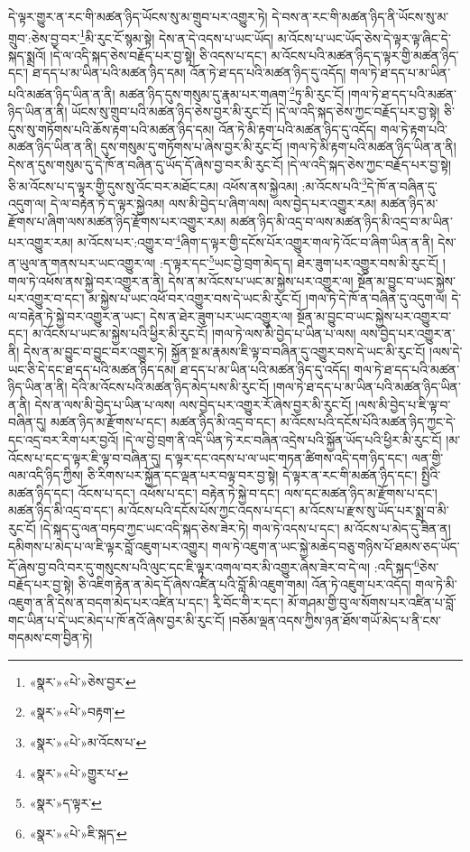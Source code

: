 དེ་ལྟར་གྱུར་ན་རང་གི་མཚན་ཉིད་ཡོངས་སུ་མ་གྲུབ་པར་འགྱུར་ཏེ། དེ་བས་ན་རང་གི་མཚན་ཉིད་ནི་ཡོངས་སུ་མ་གྲུབ་:ཅེས་བྱ་བར་\footnote{«སྣར་»«པེ་»ཅེས་བྱར་}མི་རུང་ངོ་སྙམ་སྟེ། དེས་ན་དེ་འདས་པ་ཡང་ཡོད། མ་འོངས་པ་ཡང་ཡོད་ཅེས་དེ་ལྟར་ལྟ་ཞིང་དེ་སྐད་སྨྲའོ། །དེ་ལ་འདི་སྐད་ཅེས་བརྗོད་པར་བྱ་སྟེ། ཅི་འདས་པ་དང་། མ་འོངས་པའི་མཚན་ཉིད་ད་ལྟར་གྱི་མཚན་ཉིད་དང་། ཐ་དད་པ་མ་ཡིན་པའི་མཚན་ཉིད་དམ། འོན་ཏེ་ཐ་དད་པའི་མཚན་ཉིད་དུ་འདོད། གལ་ཏེ་ཐ་དད་པ་མ་ཡིན་པའི་མཚན་ཉིད་ཡིན་ན་ནི། མཚན་ཉིད་དུས་གསུམ་དུ་རྣམ་པར་གཞག་\footnote{«སྣར་»«པེ་»བརྟག་}ཏུ་མི་རུང་ངོ། །གལ་ཏེ་ཐ་དད་པའི་མཚན་ཉིད་ཡིན་ན་ནི། ཡོངས་སུ་གྲུབ་པའི་མཚན་ཉིད་ཅེས་བྱར་མི་རུང་ངོ། །དེ་ལ་འདི་སྐད་ཅེས་ཀྱང་བརྗོད་པར་བྱ་སྟེ། ཅི་དུས་སུ་གཏོགས་པའི་ཆོས་རྟག་པའི་མཚན་ཉིད་དམ། འོན་ཏེ་མི་རྟག་པའི་མཚན་ཉིད་དུ་འདོད། གལ་ཏེ་རྟག་པའི་མཚན་ཉིད་ཡིན་ན་ནི། དུས་གསུམ་དུ་གཏོགས་པ་ཞེས་བྱར་མི་རུང་ངོ། །གལ་ཏེ་མི་རྟག་པའི་མཚན་ཉིད་ཡིན་ན་ནི། དེས་ན་དུས་གསུམ་དུ་དེ་ཁོ་ན་བཞིན་དུ་ཡོད་དོ་ཞེས་བྱ་བར་མི་རུང་ངོ། །དེ་ལ་འདི་སྐད་ཅེས་ཀྱང་བརྗོད་པར་བྱ་སྟེ། ཅི་མ་འོངས་པ་ད་ལྟར་གྱི་དུས་སུ་འོང་བར་མཐོང་ངམ། འཕོས་ནས་སྐྱེའམ། :མ་འོངས་པའི་\footnote{«སྣར་»«པེ་»མ་འོངས་པ་}དེ་ཁོ་ན་བཞིན་དུ་འདུག་ལ། དེ་ལ་བརྟེན་ཏེ་ད་ལྟར་སྐྱེའམ། ལས་མི་བྱེད་པ་ཞིག་ལས། ལས་བྱེད་པར་འགྱུར་རམ། མཚན་ཉིད་མ་རྫོགས་པ་ཞིག་ལས་མཚན་ཉིད་རྫོགས་པར་འགྱུར་རམ། མཚན་ཉིད་མི་འདྲ་བ་ལས་མཚན་ཉིད་མི་འདྲ་བ་མ་ཡིན་པར་འགྱུར་རམ། མ་འོངས་པར་:འགྱུར་བ་\footnote{«སྣར་»«པེ་»གྱུར་པ་}ཞིག་ད་ལྟར་གྱི་དངོས་པོར་འགྱུར་གལ་ཏེ་འོང་བ་ཞིག་ཡིན་ན་ནི། དེས་ན་ཡུལ་ན་གནས་པར་ཡང་འགྱུར་ལ། :ད་ལྟར་དང་\footnote{«སྣར་»ད་ལྟར་}ཡང་བྱེ་བྲག་མེད་ད། ཐེར་ཟུག་པར་འགྱུར་བས་མི་རུང་ངོ། །གལ་ཏེ་འཕོས་ནས་སྐྱེ་བར་འགྱུར་ན་ནི། དེས་ན་མ་འོངས་པ་ཡང་མ་སྐྱེས་པར་འགྱུར་ལ། སྔོན་མ་བྱུང་བ་ཡང་སྐྱེས་པར་འགྱུར་བ་དང་། མ་སྐྱེས་པ་ཡང་འཕོ་བར་འགྱུར་བས་དེ་ཡང་མི་རུང་ངོ། །གལ་ཏེ་དེ་ཁོ་ན་བཞིན་དུ་འདུག་ལ། དེ་ལ་བརྟེན་ཏེ་སྐྱེ་བར་འགྱུར་ན་ཡང་། དེས་ན་ཐེར་ཟུག་པར་ཡང་འགྱུར་ལ། སྔོན་མ་བྱུང་བ་ཡང་སྐྱེས་པར་འགྱུར་བ་དང་། མ་འོངས་པ་ཡང་མ་སྐྱེས་པའི་ཕྱིར་མི་རུང་ངོ། །གལ་ཏེ་ལས་མི་བྱེད་པ་ཡིན་པ་ལས། ལས་བྱེད་པར་འགྱུར་ན་ནི། དེས་ན་མ་བྱུང་བ་བྱུང་བར་འགྱུར་ཏེ། སྐྱོན་སྔ་མ་རྣམས་ཇི་ལྟ་བ་བཞིན་དུ་འགྱུར་བས་དེ་ཡང་མི་རུང་ངོ། །ལས་དེ་ཡང་ཅི་དེ་དང་ཐ་དད་པའི་མཚན་ཉིད་དམ། ཐ་དད་པ་མ་ཡིན་པའི་མཚན་ཉིད་དུ་འདོད། གལ་ཏེ་ཐ་དད་པའི་མཚན་ཉིད་ཡིན་ན་ནི། དེའི་མ་འོངས་པའི་མཚན་ཉིད་མེད་པས་མི་རུང་ངོ། །གལ་ཏེ་ཐ་དད་པ་མ་ཡིན་པའི་མཚན་ཉིད་ཡིན་ན་ནི། དེས་ན་ལས་མི་བྱེད་པ་ཡིན་པ་ལས། ལས་བྱེད་པར་འགྱུར་རོ་ཞེས་བྱར་མི་རུང་ངོ། །ལས་མི་བྱེད་པ་ཇི་ལྟ་བ་བཞིན་དུ། མཚན་ཉིད་མ་རྫོགས་པ་དང་། མཚན་ཉིད་མི་འདྲ་བ་དང་། མ་འོངས་པའི་དངོས་པོའི་མཚན་ཉིད་ཀྱང་དེ་དང་འདྲ་བར་རིག་པར་བྱའོ། །དེ་ལ་བྱེ་བྲག་ནི་འདི་ཡིན་ཏེ་རང་བཞིན་འདྲེས་པའི་སྐྱོན་ཡོད་པའི་ཕྱིར་མི་རུང་ངོ། །མ་འོངས་པ་དང་ད་ལྟར་ཇི་ལྟ་བ་བཞིན་དུ། ད་ལྟར་དང་འདས་པ་ལ་ཡང་གཏན་ཚིགས་འདི་དག་ཉིད་དང་། ལན་གྱི་ལམ་འདི་ཉིད་ཀྱིས། ཅི་རིགས་པར་སྐྱོན་དང་ལྡན་པར་བལྟ་བར་བྱ་སྟེ། དེ་ལྟར་ན་རང་གི་མཚན་ཉིད་དང་། སྤྱིའི་མཚན་ཉིད་དང་། འོངས་པ་དང་། འཕོས་པ་དང་། བརྟེན་ཏེ་སྐྱེ་བ་དང་། ལས་དང་མཚན་ཉིད་མ་རྫོགས་པ་དང་། མཚན་ཉིད་མི་འདྲ་བ་དང་། མ་འོངས་པའི་དངོས་པོས་ཀྱང་འདས་པ་དང་། མ་འོངས་པ་རྫས་སུ་ཡོད་པར་སྨྲ་བ་མི་རུང་ངོ། །དེ་སྐད་དུ་ལན་བཏབ་ཀྱང་ཡང་འདི་སྐད་ཅེས་ཟེར་ཏེ། གལ་ཏེ་འདས་པ་དང་། མ་འོངས་པ་མེད་དུ་ཟིན་ན། དམིགས་པ་མེད་པ་ལ་ཇི་ལྟར་བློ་འཇུག་པར་འགྱུར། གལ་ཏེ་འཇུག་ན་ཡང་སྐྱེ་མཆེད་བཅུ་གཉིས་པོ་ཐམས་ཅད་ཡོད་དོ་ཞེས་བྱ་བའི་བར་དུ་གསུངས་པའི་ལུང་དང་ཇི་ལྟར་འགལ་བར་མི་འགྱུར་ཞེས་ཟེར་བ་དེ་ལ། :འདི་སྐད་\footnote{«སྣར་»«པེ་»ཇི་སྐད་}ཅེས་བརྗོད་པར་བྱ་སྟེ། ཅི་འཇིག་རྟེན་ན་མེད་དོ་ཞེས་འཛིན་པའི་བློ་མི་འཇུག་གམ། འོན་ཏེ་འཇུག་པར་འདོད། གལ་ཏེ་མི་འཇུག་ན་ནི་དེས་ན་བདག་མེད་པར་འཛིན་པ་དང་། རྭི་བོང་གི་ར་དང་། མོ་གཤམ་གྱི་བུ་ལ་སོགས་པར་འཛིན་པ་བློ་གང་ཡིན་པ་དེ་ཡང་མེད་པ་ཁོ་ནའོ་ཞེས་བྱར་མི་རུང་ངོ། །བཅོམ་ལྡན་འདས་ཀྱིས་ཉན་ཐོས་གཡོ་མེད་པ་ནི་ངས་གདམས་ངག་བྱིན་ཏེ། 